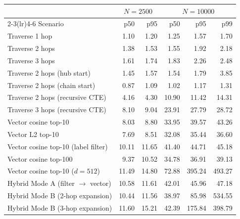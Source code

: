 \begin{tabular}{lrrrrr}
\toprule
\multicolumn{1}{l}{} & \multicolumn{2}{c}{$N=\num{2500}$} & \multicolumn{3}{c}{$N=\num{10000}$} \\ \cmidrule(lr){2-3}\cmidrule(lr){4-6}
Scenario & p50 & p95 & p50 & p95 & p99 \\
\midrule
Traverse 1 hop & 1.10 & 1.20 & 1.25 & 1.57 & 1.70 \\
Traverse 2 hops & 1.38 & 1.53 & 1.55 & 1.92 & 2.18 \\
Traverse 3 hops & 1.61 & 1.74 & 1.83 & 2.26 & 2.48 \\
Traverse 2 hops (hub start) & 1.45 & 1.57 & 1.54 & 1.79 & 3.85 \\
Traverse 2 hops (chain start) & 0.87 & 1.09 & 1.02 & 1.17 & 1.31 \\
Traverse 2 hops (recursive CTE) & 4.16 & 4.30 & 10.90 & 11.42 & 14.31 \\
Traverse 3 hops (recursive CTE) & 8.10 & 9.04 & 23.91 & 27.79 & 28.72 \\
Vector cosine top-10 & 8.03 & 8.80 & 33.95 & 39.57 & 43.26 \\
Vector L2 top-10 & 7.69 & 8.51 & 32.08 & 35.44 & 36.60 \\
Vector cosine top-10 (label filter) & 10.11 & 11.65 & 41.40 & 44.71 & 45.18 \\
Vector cosine top-100 & 9.37 & 10.52 & 34.78 & 36.91 & 39.13 \\
Vector cosine top-10 ($d=512$) & 11.49 & 14.80 & 72.88 & 395.24 & 493.27 \\
Hybrid Mode A (filter $\to$ vector) & 10.58 & 11.61 & 42.01 & 45.96 & 47.18 \\
Hybrid Mode B (2-hop expansion) & 10.44 & 11.56 & 38.97 & 85.98 & 534.55 \\
Hybrid Mode B (3-hop expansion) & 11.60 & 15.21 & 42.39 & 175.84 & 398.79 \\
\bottomrule
\end{tabular}
